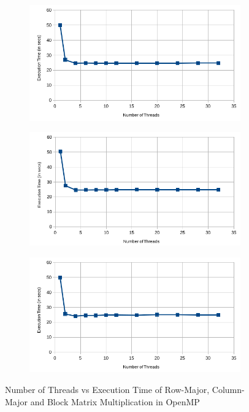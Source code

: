\documentclass{article}
\begin{document}
\begin{figure}[!htbp]

	\centering
	\begin{subfigure}[!htbp]{\textwidth}
		\centering
		\includegraphics[scale=0.8]{rowmajorperformance}
	\end{subfigure}
	
	\begin{subfigure}[!htbp]{\textwidth}
		\centering
		\includegraphics[scale=0.8]{columnmajorperformance}
	\end{subfigure}
	
	\begin{subfigure}[!htbp]{\textwidth}
		\centering
		\includegraphics[scale=0.8]{blockorderperformance}
	\end{subfigure}
	
	\caption{Number of Threads vs Execution Time of Row-Major, Column-Major and Block Matrix Multiplication in OpenMP}
\end{figure}
\end{document}
